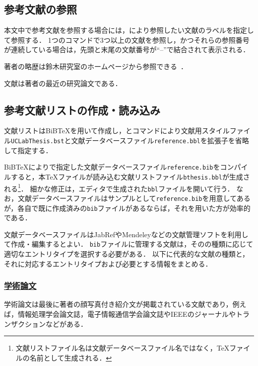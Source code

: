 \documentclass[a4j,11pt]{ujreport}
\begin{document}
\subsection{参考文献の参照}
本文中で参考文献を参照する場合には，により参照したい文献のラベルを指定して参照する．
1つのコマンドで3つ以上の文献を参照し，かつそれらの参照番号が連続している場合は，先頭と末尾の文献番号が``--''で結合されて表示される．

\begin{screen}
著者の略歴は鈴木研究室のホームページから参照できる~\cite{UCLab}．

文献\cite{GSRA,MPPC-HP,NTMobile}は著者の最近の研究論文である．
\end{screen}

\subsection{参考文献リストの作成・読み込み}
\label{subsec:ReferenceInfo}
文献リストはBiB{\TeX}を用いて作成し，とコマンドにより文献用スタイルファイル\texttt{UCLabThesis.bst}と文献データベースファイル\texttt{reference.bbl}を拡張子を省略して指定する．

\begin{code}
\end{code}

BiB{\TeX}によりで指定した文献データベースファイル\texttt{reference.bib}をコンパイルすると，本{\TeX}ファイルが読み込む文献リストファイル\texttt{bthesis.bbl}が生成される\footnote{文献リストファイル名は文献データベースファイル名ではなく，{\TeX}ファイルの名前として生成される．}．
細かな修正は，エディタで生成された\texttt{bbl}ファイルを開いて行う．
なお，文献データベースファイルはサンプルとして\texttt{reference.bib}を用意してあるが，各自で既に作成済みの\texttt{bib}ファイルがあるならば，それを用いた方が効率的である．

文献データベースファイルはJabRef\cite{JabRef}やMendeley\cite{Mendeley}などの文献管理ソフトを利用して作成・編集するとよい．
\texttt{bib}ファイルに管理する文献は，そのの種類に応じて適切なエントリタイプを選択する必要がある．
以下に代表的な文献の種類と，それに対応するエントリタイプおよび必要とする情報をまとめる．

\subsubsection{\underline{学術論文}}
学術論文は最後に著者の顔写真付き紹介文が掲載されている文献であり，例えば，情報処理学会論文誌，電子情報通信学会論文誌やIEEEのジャーナルやトランザクションなどがある．
\end{document}
